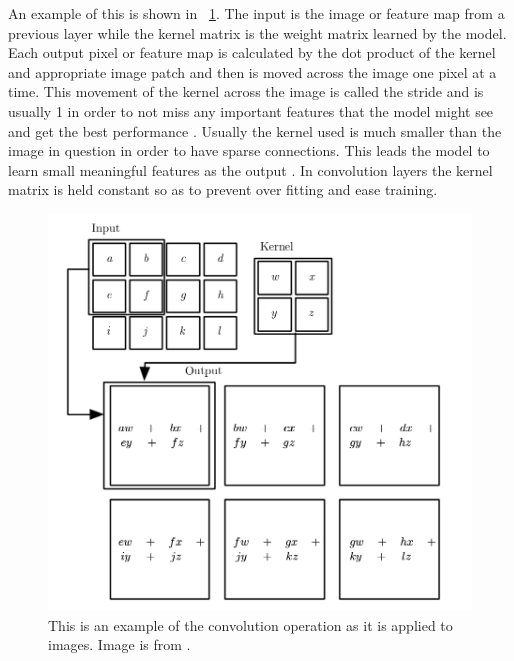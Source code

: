     An example of this is shown in ~\ref{fig_convolutionOperation}. 
    The input is the image or feature map from a previous layer while the kernel matrix is the weight matrix learned by the model. 
    Each output pixel or feature map is calculated by the dot product of the kernel and appropriate image patch and then is moved across the image one pixel at a time. 
    This movement of the kernel across the image is called the stride and is usually 1 in order to not miss any important features that the model might see and get the best performance \cite{pmlr-v15-coates11a}. 
    Usually the kernel used is much smaller than the image in question in order to have sparse connections.
    This leads the model to learn small meaningful features as the output \cite{Goodfellow-et-al-2016}. 
    In convolution layers the kernel matrix is held constant so as to prevent over fitting and ease training. 

\begin{figure}[tbh]
\centering
\includegraphics[width=\textwidth]{convolution_operation.png}
\caption{This is an example of the convolution operation as it is applied to images. Image is from \cite{Goodfellow-et-al-2016}.}
\label{fig_convolutionOperation}
\end{figure} 


